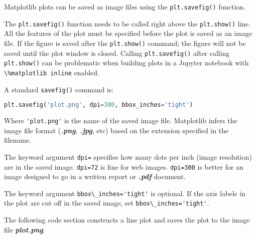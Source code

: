 \documentclass{book}
\newcommand{\passthrough}[1]{#1}
\begin{document}
    
        Matplotlib plots can be saved as image files using the
\passthrough{\lstinline!plt.savefig()!} function.

The \passthrough{\lstinline!plt.savefig()!} function needs to be called
right above the \passthrough{\lstinline!plt.show()!} line. All the
features of the plot must be specified before the plot is saved as an
image file. If the figure is saved after the
\passthrough{\lstinline!plt.show()!} command; the figure will not be
saved until the plot window is closed. Calling
\passthrough{\lstinline!plt.savefig()!} after calling
\passthrough{\lstinline!plt.show()!} can be problematic when building
plots in a Jupyter notebook with
\passthrough{\lstinline!\%matplotlib inline!} enabled.

A standard \passthrough{\lstinline!savefig()!} command is:

\begin{lstlisting}[language=Python]
plt.savefig('plot.png', dpi=300, bbox_inches='tight')
\end{lstlisting}

Where \passthrough{\lstinline!'plot.png'!} is the name of the saved
image file. Matplotlib infers the image file format
(\textbf{\emph{.png}}, \textbf{\emph{.jpg}}, etc) based on the extension
specified in the filename.

The keyword argument \passthrough{\lstinline!dpi=!} specifies how many
dots per inch (image resolution) are in the saved image.
\passthrough{\lstinline!dpi=72!} is fine for web images.
\passthrough{\lstinline!dpi=300!} is better for an image designed to go
in a written report or \textbf{\emph{.pdf}} document.

The keyword argument \passthrough{\lstinline!bbox\_inches='tight'!} is
optional. If the axis labels in the plot are cut off in the saved image,
set \passthrough{\lstinline!bbox\_inches='tight'!}.

The following code section constructs a line plot and saves the plot to
the image file \textbf{\emph{plot.png}}.
    
\end{document}
